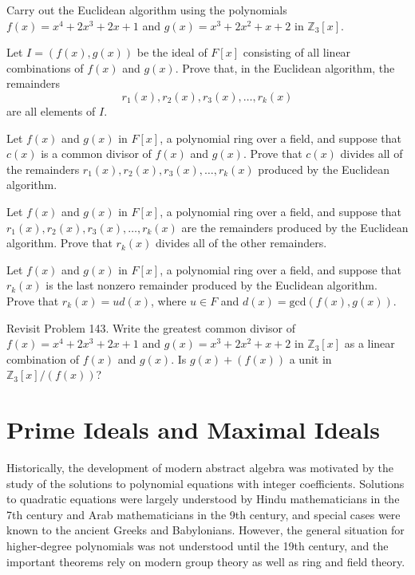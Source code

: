 \begin{problem}
Carry out the Euclidean algorithm using the polynomials \(f(x)=x^4+2x^3+2x+1\) and \(g(x) = x^3+2x^2+x+2\) in \(\mathbb{Z}_3[x]\).
\end{problem}

\begin{problem}
Let \(I = (f(x),g(x))\) be the ideal of \(F[x]\) consisting of all linear combinations of \(f(x)\) and \(g(x)\). Prove that, in the Euclidean algorithm, the remainders
$$r_1(x), r_2(x), r_3(x), \ldots , r_k(x)$$
are all elements of \(I\).
\end{problem}

\begin{problem}
Let \(f(x)\) and \(g(x)\) in \(F[x]\), a polynomial ring over a field, and suppose that \(c(x)\) is a common divisor of \(f(x)\) and \(g(x)\). Prove that \(c(x)\) divides all of the remainders \(r_1(x), r_2(x), r_3(x), \ldots , r_k(x)\) produced by the Euclidean algorithm.
\end{problem}

\begin{problem}
Let \(f(x)\) and \(g(x)\) in \(F[x]\), a polynomial ring over a field, and suppose that \(r_1(x), r_2(x), r_3(x), \ldots , r_k(x)\)  are the remainders produced by the Euclidean algorithm. Prove that \(r_k(x)\) divides all of the other remainders.
\end{problem}

\begin{problem}
Let \(f(x)\) and \(g(x)\) in \(F[x]\), a polynomial ring over a field, and suppose that \(r_k(x)\) is the last nonzero remainder produced by the Euclidean algorithm. Prove that \(r_k(x) = ud(x)\), where \(u \in F\) and \(d(x)=\mbox{gcd}(f(x),g(x))\).
\end{problem}

\begin{problem}
Revisit Problem 143. Write the greatest common divisor of \(f(x)=x^4+2x^3+2x+1\) and \(g(x) = x^3+2x^2+x+2\) in \(\mathbb{Z}_3[x]\) as a linear combination of \(f(x)\) and \(g(x)\). Is \(g(x)+(f(x))\) a unit in \(\mathbb{Z}_3[x]/(f(x))\)?
\end{problem}

\chapter{Prime Ideals and Maximal Ideals}

Historically, the development of modern abstract algebra was motivated by the study of the solutions to polynomial equations with integer coefficients. Solutions to quadratic equations were largely understood by Hindu mathematicians in the 7th century and Arab mathematicians in the 9th century, and special cases were known to the ancient Greeks and Babylonians. However, the general situation for higher-degree polynomials was not understood until the 19th century, and the important theorems rely on modern group theory as well as ring and field theory.

